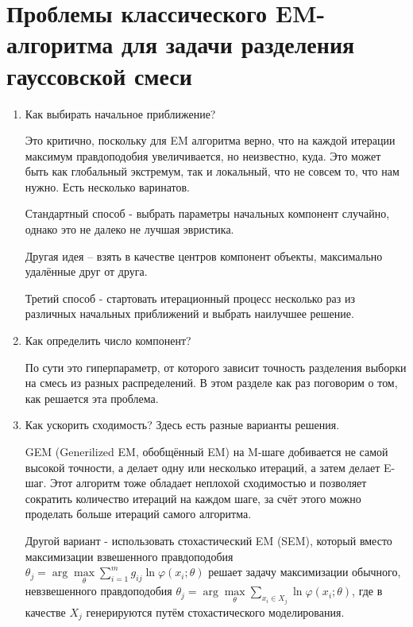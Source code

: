 \newpage

\section*{\textbf{Проблемы классического EM-алгоритма для задачи разделения гауссовской смеси}}
\begin{enumerate}
    \item Как выбирать начальное приближение?

          Это критично, поскольку для EM алгоритма верно, что на каждой итерации максимум правдоподобия увеличивается, но неизвестно, куда. Это может быть как глобальный экстремум, так и локальный, что не совсем то, что нам нужно. Есть несколько варинатов.

          Стандартный способ - выбрать параметры начальных компонент случайно, однако это не далеко не лучшая эвристика.

          Другая идея -- взять в качестве центров компонент объекты, максимально удалённые друг от друга.

          Третий способ - стартовать итерационный процесс несколько раз из различных начальных приближений и выбрать наилучшее решение.

    \item Как определить число компонент?

          По сути это гиперпараметр, от которого зависит точность разделения выборки на смесь из разных распределений. В этом разделе как раз поговорим о том, как решается эта проблема.

    \item Как ускорить сходимость? Здесь есть разные варианты решения.

          GEM (Generilized EM, обобщённый EM) на M-шаге добивается не самой высокой точности, а делает одну или несколько итераций, а затем делает E-шаг. Этот алгоритм тоже обладает неплохой сходимостью и позволяет сократить количество итераций на каждом шаге, за счёт этого можно проделать больше итераций самого алгоритма.

          Другой вариант - использовать стохастический EM (SEM), который вместо максимизации взвешенного правдоподобия $\theta_j = \arg\max\limits_{\theta}\sum\limits_{i=1}^m g_{ij}\ln\varphi(x_i; \theta)$ решает задачу максимизации обычного, невзвешенного правдоподобия $\theta_j = \arg\max\limits_{\theta}\sum\limits_{x_i \in X_j} \ln\varphi(x_i; \theta)$, где в качестве $X_j$ генерируются путём стохастического моделирования.

\end{enumerate}

